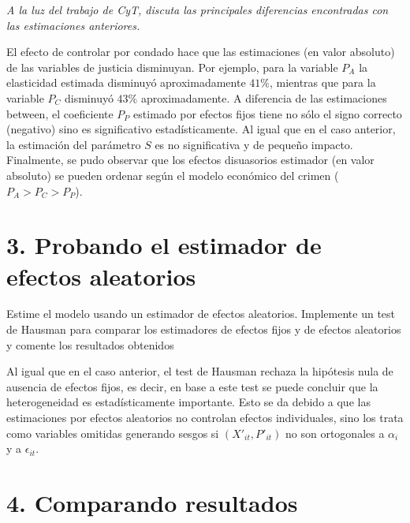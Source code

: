 \documentclass[
]{article}
\begin{document}
\emph{A la luz del trabajo de CyT, discuta las principales diferencias
encontradas con las estimaciones anteriores.}

El efecto de controlar por condado hace que las estimaciones (en valor
absoluto) de las variables de justicia disminuyan. Por ejemplo, para la
variable \(P_A\) la elasticidad estimada disminuyó aproximadamente
\(41\%\), mientras que para la variable \(P_C\) disminuyó \(43\%\)
aproximadamente. A diferencia de las estimaciones between, el
coeficiente \(P_P\) estimado por efectos fijos tiene no sólo el signo
correcto (negativo) sino es significativo estadísticamente. Al igual que
en el caso anterior, la estimación del parámetro \(S\) es no
significativa y de pequeño impacto. Finalmente, se pudo observar que los
efectos disuasorios estimador (en valor absoluto) se pueden ordenar
según el modelo económico del crimen (\(P_A>P_C>P_P\)).

\hypertarget{probando-el-estimador-de-efectos-aleatorios}{%
\section{3. Probando el estimador de efectos
aleatorios}\label{probando-el-estimador-de-efectos-aleatorios}}

Estime el modelo usando un estimador de efectos aleatorios. Implemente
un test de Hausman para comparar los estimadores de efectos fijos y de
efectos aleatorios y comente los resultados obtenidos

Al igual que en el caso anterior, el test de Hausman rechaza la
hipótesis nula de ausencia de efectos fijos, es decir, en base a este
test se puede concluir que la heterogeneidad es estadísticamente
importante. Esto se da debido a que las estimaciones por efectos
aleatorios no controlan efectos individuales, sino los trata como
variables omitidas generando sesgos si \((X'_{it},P'_{it})\) no son
ortogonales a \(\alpha_i\) y a \(\epsilon_{it}\).

\hypertarget{comparando-resultados}{%
\section{4. Comparando resultados}\label{comparando-resultados}}
\end{document}
